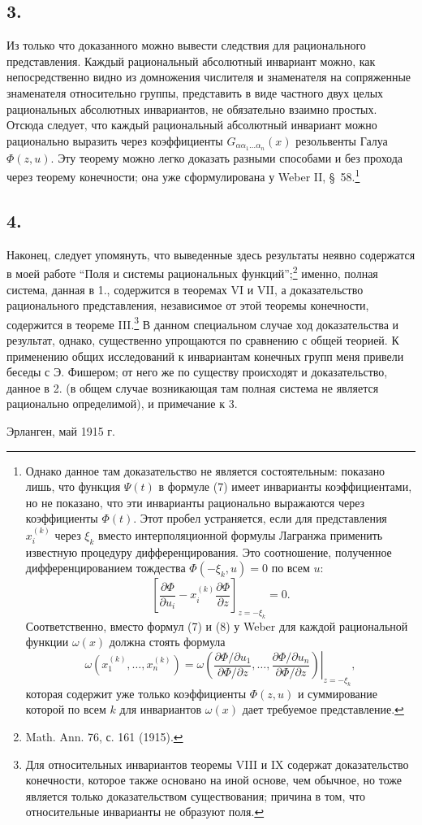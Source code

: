 \documentclass[11pt]{article}
\begin{document}
\subsection*{3.}
Из только что доказанного можно вывести следствия для рационального представления. Каждый рациональный абсолютный инвариант можно, как непосредственно видно из домножения числителя и знаменателя на сопряженные знаменателя относительно группы, представить в виде частного двух целых рациональных абсолютных инвариантов, не обязательно взаимно простых. Отсюда следует, что каждый рациональный абсолютный инвариант можно рационально выразить через коэффициенты $G_{\alpha\alpha_1\ldots\alpha_n}(x)$ резольвенты Галуа $\Phi(z,u)$. Эту теорему можно легко доказать разными способами и без прохода через теорему конечности; она уже сформулирована у Weber II, \S\ 58.\footnote{Однако данное там доказательство не является состоятельным: показано лишь, что функция $\Psi(t)$ в формуле (7) имеет инварианты коэффициентами, но не показано, что эти инварианты рационально выражаются через коэффициенты $\Phi(t)$. Этот пробел устраняется, если для представления $x_i^{(k)}$ через $\xi_k$ вместо интерполяционной формулы Лагранжа применить известную процедуру дифференцирования. Это соотношение, полученное дифференцированием тождества $\Phi(-\xi_k,u)=0$ по всем $u$:
\[
 \left[\frac{\partial\Phi}{\partial u_i}
      -x_i^{(k)}\frac{\partial\Phi}{\partial z}\right]_{z=-\xi_k}=0.
\]
Соответственно, вместо формул (7) и (8) у Weber для каждой рациональной функции $\omega(x)$ должна стоять формула
\[
 \omega(x_1^{(k)},\ldots,x_n^{(k)})=
 \left.
 \omega\!\left(
   \frac{\partial\Phi/\partial u_1}{\partial\Phi/\partial z},\ldots,
   \frac{\partial\Phi/\partial u_n}{\partial\Phi/\partial z}
 \right)\right|_{z=-\xi_k},
\]
которая содержит уже только коэффициенты $\Phi(z,u)$ и суммирование которой по всем $k$ для инвариантов $\omega(x)$ дает требуемое представление.}

\subsection*{4.}
Наконец, следует упомянуть, что выведенные здесь результаты неявно содержатся в моей работе ``Поля и системы рациональных функций'';\footnote{Math. Ann. 76, с. 161 (1915).} именно, полная система, данная в 1., содержится в теоремах VI и VII, а доказательство рационального представления, независимое от этой теоремы конечности, содержится в теореме III.\footnote{Для относительных инвариантов теоремы VIII и IX содержат доказательство конечности, которое также основано на иной основе, чем обычное, но тоже является только доказательством существования; причина в том, что относительные инварианты не образуют поля.} В данном специальном случае ход доказательства и результат, однако, существенно упрощаются по сравнению с общей теорией. К применению общих исследований к инвариантам конечных групп меня привели беседы с Э. Фишером; от него же по существу происходят и доказательство, данное в 2. (в общем случае возникающая там полная система не является рационально определимой), и примечание к 3.

Эрланген, май 1915 г.
\end{document}
